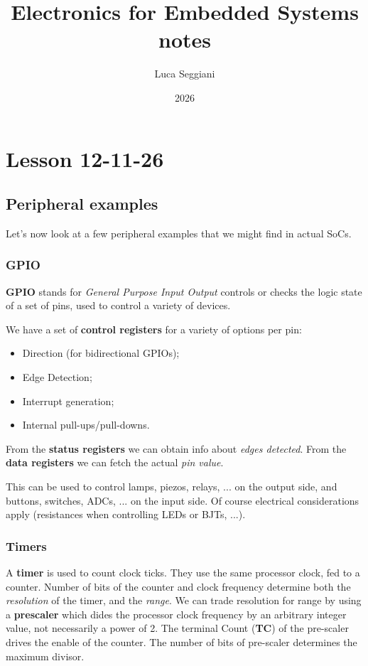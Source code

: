 \documentclass[a4paper,11pt]{article}
\title{Electronics for Embedded Systems notes}
\author{Luca Seggiani}
\date{2026}
\begin{document}
\section{Lesson 12-11-26}

\thispagestyle{empty}
\pagestyle{fancy}


\subsection{Peripheral examples}

Let's now look at a few peripheral examples that we might find in actual SoCs.

\subsubsection{GPIO}

\textbf{GPIO} stands for \textit{General Purpose Input Output} controls or checks the logic state of a set of pins, used to control a variety of devices.

We have a set of \textbf{control registers} for a variety of options per pin:
\begin{itemize}
\item Direction (for bidirectional GPIOs);
\item Edge Detection;
\item Interrupt generation;
\item Internal pull-ups/pull-downs.
\end{itemize}

From the \textbf{status registers} we can obtain info about \textit{edges detected}.
From the \textbf{data registers} we can fetch the actual \textit{pin value}.

This can be used to control lamps, piezos, relays, ... on the output side, and buttons, switches, ADCs, ... on the input side.
Of course electrical considerations apply (resistances when controlling LEDs or BJTs, ...).

\subsubsection{Timers}

A \textbf{timer} is used to count clock ticks. They use the same processor clock, fed to a counter.
Number of bits of the counter and clock frequency determine both the \textit{resolution} of the timer, and the \textit{range}.
We can trade resolution for range by using a \textbf{prescaler} which dides the processor clock frequency by an arbitrary integer value, not necessarily a power of 2.
The terminal Count (\textbf{TC}) of the pre-scaler drives the enable of the counter.
The number of bits of pre-scaler determines the maximum divisor.
\end{document}
